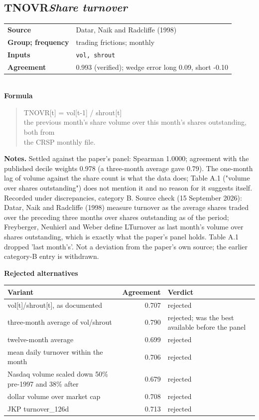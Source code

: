 \documentclass[11pt]{article}
\begin{document}
\subsection*{TNOVR\quad\normalfont\itshape Share turnover}
\begin{tabular}{@{}p{3.3cm}p{12.3cm}@{}}
\textbf{Source} & Datar, Naik and Radcliffe (1998)\\
\textbf{Group; frequency} & trading frictions; monthly\\
\textbf{Inputs} & \texttt{vol, shrout}\\
\textbf{Agreement} & 0.993 (verified); wedge error long 0.09, short -0.10\\
\end{tabular}\\[4pt]
\textbf{Formula}
\begin{quote}\small
TNOVR[t] = vol[t-1] / shrout[t]\\
the previous month's share volume over this month's shares outstanding, both from\\
the CRSP monthly file.\\

\end{quote}
\textbf{Notes.} Settled against the paper's panel: Spearman 1.0000; agreement with the published decile weights 0.978 (a three-month average gave 0.79). The one-month lag of volume against the share count is what the data does; Table A.1 ("volume over shares outstanding") does not mention it and no reason for it suggests itself. Recorded under discrepancies, category B. Source check (15 September 2026): Datar, Naik and Radcliffe (1998) measure turnover as the average shares traded over the preceding three months over shares outstanding as of the period; Freyberger, Neuhierl and Weber define LTurnover as last month's volume over shares outstanding, which is exactly what the paper's panel holds. Table A.1 dropped 'last month's'. Not a deviation from the paper's own source; the earlier category-B entry is withdrawn.

\textbf{Rejected alternatives}\\[2pt]
{\small\begin{longtable}{@{}p{9.6cm}rp{4.3cm}@{}}
\toprule Variant & Agreement & Verdict\\\midrule\endhead
vol[t]/shrout[t], as documented & 0.707 & rejected\\
three-month average of vol/shrout & 0.790 & rejected; was the best available before the panel\\
twelve-month average & 0.699 & rejected\\
mean daily turnover within the month & 0.706 & rejected\\
Nasdaq volume scaled down 50\% pre-1997 and 38\% after & 0.679 & rejected\\
dollar volume over market cap & 0.708 & rejected\\
JKP turnover\_126d & 0.713 & rejected\\
\bottomrule\end{longtable}}
\end{document}
